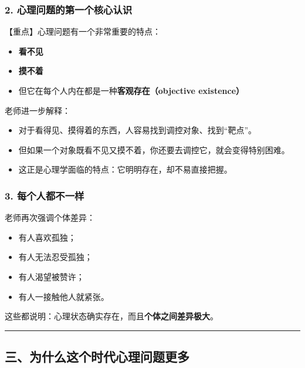 \documentclass[
  chinese,
  9pt,
  a4paper,
]{ctexart}
\providecommand{\tightlist}{%
  \setlength{\itemsep}{0pt}\setlength{\parskip}{0pt}}
\begin{document}
\subsubsection{2.
心理问题的第一个核心认识}\label{ux5fc3ux7406ux95eeux9898ux7684ux7b2cux4e00ux4e2aux6838ux5fc3ux8ba4ux8bc6}

【重点】心理问题有一个非常重要的特点：

\begin{itemize}
\tightlist
\item
  \textbf{看不见}
\item
  \textbf{摸不着}
\item
  但它在每个人内在都是一种\textbf{客观存在（objective existence）}
\end{itemize}

老师进一步解释：

\begin{itemize}
\tightlist
\item
  对于看得见、摸得着的东西，人容易找到调控对象、找到``靶点''。
\item
  但如果一个对象既看不见又摸不着，你还要去调控它，就会变得特别困难。
\item
  这正是心理学面临的特点：它明明存在，却不易直接把握。
\end{itemize}

\subsubsection{3.
每个人都不一样}\label{ux6bcfux4e2aux4ebaux90fdux4e0dux4e00ux6837}

老师再次强调个体差异：

\begin{itemize}
\tightlist
\item
  有人喜欢孤独；
\item
  有人无法忍受孤独；
\item
  有人渴望被赞许；
\item
  有人一接触他人就紧张。
\end{itemize}

这些都说明：心理状态确实存在，而且\textbf{个体之间差异极大}。

\begin{center}\rule{0.5\linewidth}{0.5pt}\end{center}

\subsection{三、为什么这个时代心理问题更多}\label{ux4e09ux4e3aux4ec0ux4e48ux8fd9ux4e2aux65f6ux4ee3ux5fc3ux7406ux95eeux9898ux66f4ux591a}
\end{document}
